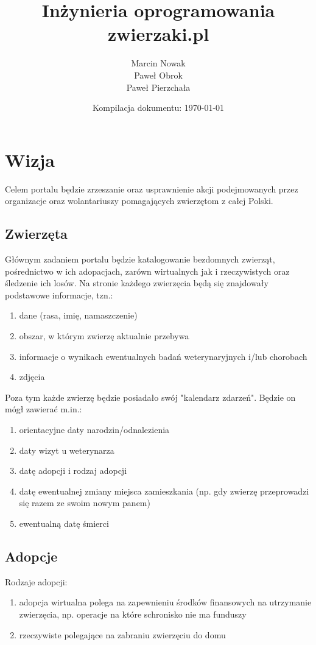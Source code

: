 \documentclass[10pt,a4paper]{article}
\title{Inżynieria oprogramowania\\zwierzaki.pl}
\author{Marcin Nowak\\Paweł Obrok\\Paweł Pierzchała}
\date{Kompilacja dokumentu: \today}
\begin{document}
\maketitle
\clearpage

\tableofcontents
\clearpage

\section{Wizja}

Celem portalu będzie zrzeszanie oraz usprawnienie akcji podejmowanych przez organizacje oraz wolantariuszy pomagających zwierzętom z całej Polski.

\subsection{Zwierzęta}

Głównym zadaniem portalu będzie katalogowanie bezdomnych zwierząt, pośrednictwo w ich adopacjach, zarówn wirtualnych jak i rzeczywistych oraz śledzenie ich losów. Na stronie każdego zwierzęcia będą się znajdowały podstawowe informacje, tzn.:
\begin{enumerate}
	\item dane (rasa, imię, namaszczenie)
	\item obszar, w którym zwierzę aktualnie przebywa
	\item informacje o wynikach ewentualnych badań weterynaryjnych i/lub chorobach
	\item zdjęcia
\end{enumerate}

Poza tym każde zwierzę będzie posiadało swój "kalendarz zdarzeń". Będzie on mógł zawierać m.in.:
\begin{enumerate}
	\item orientacyjne daty narodzin/odnalezienia
	\item daty wizyt u weterynarza
	\item datę adopcji i rodzaj adopcji
	\item datę ewentualnej zmiany miejsca zamieszkania (np. gdy zwierzę przeprowadzi się razem ze swoim nowym panem)
	\item ewentualną datę śmierci
\end{enumerate}

\subsection{Adopcje}

Rodzaje adopcji:
\begin{enumerate}
	\item adopcja wirtualna polega na zapewnieniu środków finansowych na utrzymanie zwierzęcia, np. operacje na które schronisko nie ma funduszy
	\item rzeczywiste polegające na zabraniu zwierzęciu do domu
\end{enumerate}
\end{document}

